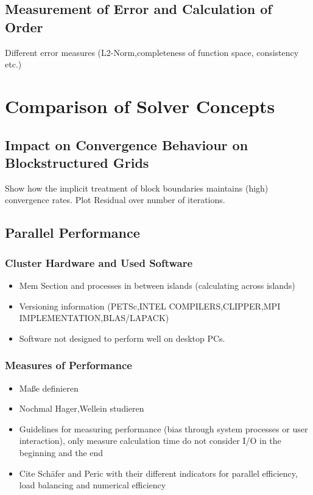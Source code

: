 \documentclass[article,type=msc,colorback,accentcolor=tud2a]{tudthesis}
\begin{document}
    \subsection{Measurement of Error and Calculation of Order}
      Different error measures (L2-Norm,completeness of function space, consistency etc.)

  \section{Comparison of Solver Concepts}
  
    \subsection{Impact on Convergence Behaviour on Blockstructured Grids}

      Show how the implicit treatment of block boundaries maintains (high) convergence rates. Plot Residual over number of iterations.

    \subsection{Parallel Performance}
      \subsubsection{Cluster Hardware and Used Software}
        \begin{itemize}
          \item Mem Section and processes in between islands (calculating across islands)
          \item Versioning information (PETSc,INTEL COMPILERS,CLIPPER,MPI IMPLEMENTATION,BLAS/LAPACK)
          \item Software not designed to perform well on desktop PCs.
        \end{itemize}

      \subsubsection{Measures of Performance}
        \begin{itemize}
          \item Maße definieren
          \item Nochmal Hager,Wellein studieren
          \item Guidelines for measuring performance (bias through system processes or user interaction), only measure calculation time do not consider I/O in the beginning and the end
          \item Cite Schäfer and Peric with their different indicators for parallel efficiency, load balancing and numerical efficiency
        \end{itemize}
\end{document}
